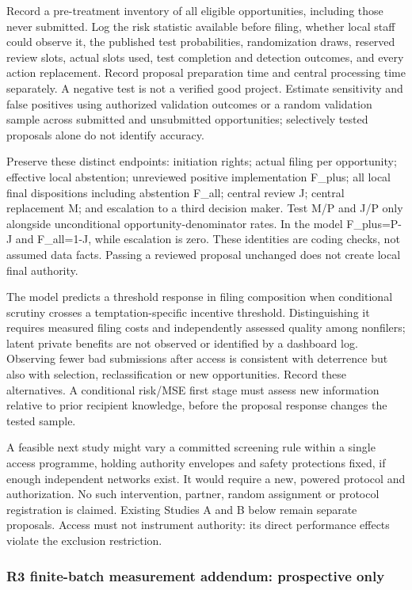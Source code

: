 \documentclass[
  11pt,
]{article}
\begin{document}
Record a pre-treatment inventory of all eligible opportunities,
including those never submitted. Log the risk statistic available before
filing, whether local staff could observe it, the published test
probabilities, randomization draws, reserved review slots, actual slots
used, test completion and detection outcomes, and every action
replacement. Record proposal preparation time and central processing
time separately. A negative test is not a verified good project.
Estimate sensitivity and false positives using authorized validation
outcomes or a random validation sample across submitted and unsubmitted
opportunities; selectively tested proposals alone do not identify
accuracy.

Preserve these distinct endpoints: initiation rights; actual filing per
opportunity; effective local abstention; unreviewed positive
implementation F\_plus; all local final dispositions including
abstention F\_all; central review J; central replacement M; and
escalation to a third decision maker. Test M/P and J/P only alongside
unconditional opportunity-denominator rates. In the model F\_plus=P-J
and F\_all=1-J, while escalation is zero. These identities are coding
checks, not assumed data facts. Passing a reviewed proposal unchanged
does not create local final authority.

The model predicts a threshold response in filing composition when
conditional scrutiny crosses a temptation-specific incentive threshold.
Distinguishing it requires measured filing costs and independently
assessed quality among nonfilers; latent private benefits are not
observed or identified by a dashboard log. Observing fewer bad
submissions after access is consistent with deterrence but also with
selection, reclassification or new opportunities. Record these
alternatives. A conditional risk/MSE first stage must assess new
information relative to prior recipient knowledge, before the proposal
response changes the tested sample.

A feasible next study might vary a committed screening rule within a
single access programme, holding authority envelopes and safety
protections fixed, if enough independent networks exist. It would
require a new, powered protocol and authorization. No such intervention,
partner, random assignment or protocol registration is claimed. Existing
Studies A and B below remain separate proposals. Access must not
instrument authority: its direct performance effects violate the
exclusion restriction.

\subsubsection{R3 finite-batch measurement addendum: prospective
only}\label{r3-finite-batch-measurement-addendum-prospective-only}
\end{document}
